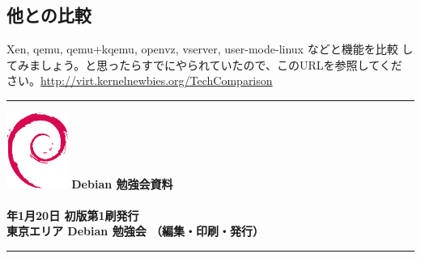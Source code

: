 \documentclass[mingoth,a4paper,twoside]{jsarticle}
\newcommand{\debmtgyear}{2007}
\newcommand{\debmtgdate}{20}
\newcommand{\debmtgmonth}{1}
\begin{document}
\subsection{他との比較}

Xen, qemu, qemu+kqemu, openvz, vserver, user-mode-linux などと機能を比較
してみましょう。と思ったらすでにやられていたので、このURLを参照してくだ
さい。\url{http://virt.kernelnewbies.org/TechComparison}

\cleartoevenpage

\begin{minipage}[b]{0.2\hsize}
 \colorbox{titleback}{}
\end{minipage}
\begin{minipage}[b]{0.8\hsize}

\vspace*{15cm}
\hrule
\vspace{2mm}
\includegraphics[width=2cm]{image200502/openlogo-nd.eps}
\noindent \Large \bf Debian 勉強会資料\\ \\
\noindent \normalfont \debmtgyear{}年\debmtgmonth{}月\debmtgdate{}日 \hspace{5mm}  初版第1刷発行\\
\noindent \normalfont 東京エリア Debian 勉強会 （編集・印刷・発行）\\
\hrule
\end{minipage}
\end{document}
